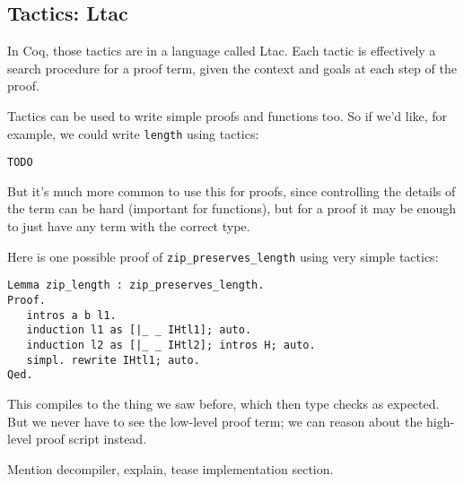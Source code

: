 \subsection{Tactics: Ltac}
\label{sec:tactics}

In Coq, those tactics are in a language called Ltac.
Each tactic is effectively a search procedure for a proof term, given the context and goals at each step of the proof.

Tactics can be used to write simple proofs and functions too.
So if we'd like, for example, we could write \lstinline{length} using tactics:

\begin{lstlisting}
TODO
\end{lstlisting}
But it's much more common to use this for proofs, since controlling the details of the term can be hard (important for functions),
but for a proof it may be enough to just have any term with the correct type.

Here is one possible proof of \lstinline{zip_preserves_length} using very simple tactics:
\begin{lstlisting}
Lemma zip_length : zip_preserves_length.
Proof.
   intros a b l1.
   induction l1 as [|_ _ IHtl1]; auto.
   induction l2 as [|_ _ IHtl2]; intros H; auto.
   simpl. rewrite IHtl1; auto.
Qed.
\end{lstlisting}
This compiles to the thing we saw before, which then type checks as expected.
But we never have to see the low-level proof term; we can reason about the high-level proof script instead.

Mention decompiler, explain, tease implementation section.

